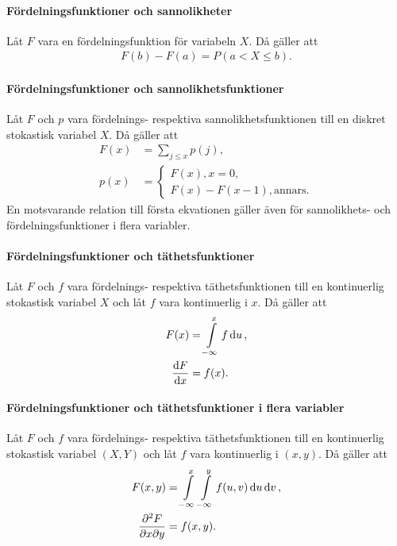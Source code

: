\proof

\paragraph{Fördelningsfunktioner och sannolikheter}
Låt $F$ vara en fördelningsfunktion för variabeln $X$. Då gäller att
\begin{align*}
	F(b) - F(a) = P(a < X\leq b).
\end{align*}

\proof

\paragraph{Fördelningsfunktioner och sannolikhetsfunktioner}
Låt $F$ och $p$ vara fördelnings- respektiva sannolikhetsfunktionen till en diskret stokastisk variabel $X$. Då gäller att
\begin{align*}
	F(x) &= \sum\limits_{j\leq x}p(j), \\
	p(x) &=
	\begin{cases}
		F(x), x = 0, \\
		F(x) - F(x - 1), \text{annars}.
	\end{cases}
\end{align*}
En motsvarande relation till första ekvationen gäller även för sannolikhets- och fördelningsfunktioner i flera variabler.

\proof

\paragraph{Fördelningsfunktioner och täthetsfunktioner}
Låt $F$ och $f$ vara fördelnings- respektiva täthetsfunktionen till en kontinuerlig stokastisk variabel $X$ och låt $f$ vara kontinuerlig i $x$. Då gäller att
\begin{align*}
	F(x)          &= \int\limits_{-\infty}^{x}f\dd{u}, \\
	\dv{F}{x} (x) &= f(x).
\end{align*}

\proof

\paragraph{Fördelningsfunktioner och täthetsfunktioner i flera variabler}
Låt $F$ och $f$ vara fördelnings- respektiva täthetsfunktionen till en kontinuerlig stokastisk variabel $(X, Y)$ och låt $f$ vara kontinuerlig i $(x, y)$. Då gäller att
\begin{align*}
	F(x, y)          &= \int\limits_{-\infty}^{x}\int\limits_{-\infty}^{y}f(u, v)\dd{u}\dd{v}, \\
	\pdv{F}{x}{y} (x, y) &= f(x, y).
\end{align*}

